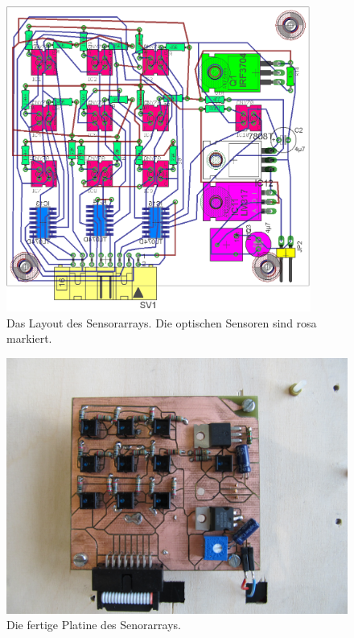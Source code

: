 \documentclass[a4paper,bibtotoc,oneside]{scrbook}
\begin{document}
\begin{figure}[htbp]
\centering
\includegraphics[width=100mm]{img/array21.png}
\caption{Das Layout des Sensorarrays. Die optischen Sensoren sind rosa markiert.}\label{array2}
\end{figure}

\begin{figure}[htbp]
\centering
\includegraphics[width=125mm]{img/sensor_array.jpg}
\caption{Die fertige Platine des Senorarrays.}\label{array3}
\end{figure}
\end{document}
